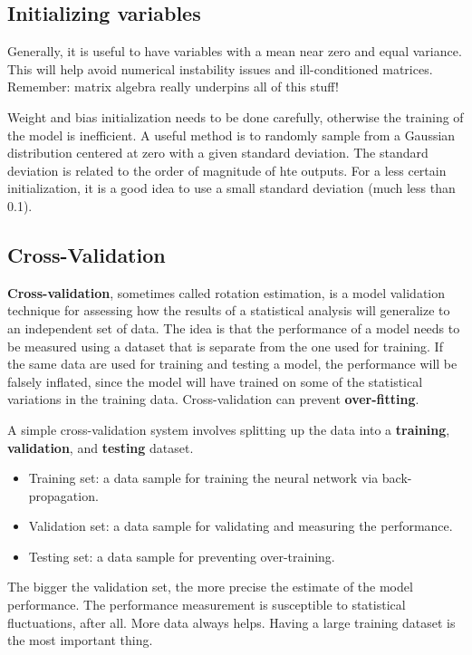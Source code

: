 \subsection{Initializing variables}

Generally, it is useful to have variables with a mean near zero and equal variance. This will help avoid numerical instability issues and ill-conditioned matrices. Remember: matrix algebra really underpins all of this stuff!

Weight and bias initialization needs to be done carefully, otherwise the training of the model is inefficient. A useful method is to randomly sample from a Gaussian distribution centered at zero with a given standard deviation. The standard deviation is related to the order of magnitude of hte outputs. For a less certain initialization, it is a good idea to use a small standard deviation (much less than 0.1).

\subsection{Cross-Validation}

\textbf{Cross-validation}, sometimes called rotation estimation, is a model validation technique for assessing how the results of a statistical analysis will generalize to an independent set of data. The idea is that the performance of a model needs to be measured using a dataset that is separate from the one used for training. If the same data are used for training and testing a model, the performance will be falsely inflated, since the model will have trained on some of the statistical variations in the training data. Cross-validation can prevent \textbf{over-fitting}.

A simple cross-validation system involves splitting up the data into a \textbf{training}, \textbf{validation}, and \textbf{testing} dataset. 

\begin{itemize}
	\item Training set: a data sample for training the neural network via back-propagation. 
	\item Validation set: a data sample for validating and measuring the performance.
	\item Testing set: a data sample for preventing over-training. 
\end{itemize}

The bigger the validation set, the more precise the estimate of the model performance. The performance measurement is susceptible to statistical fluctuations, after all. More data always helps. Having a large training dataset is the most important thing. 


